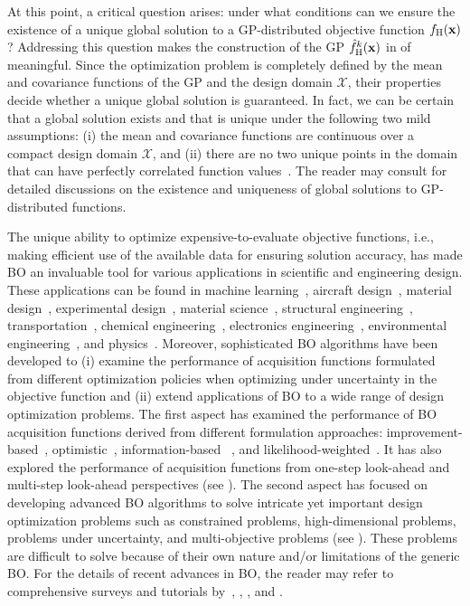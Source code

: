 \documentclass[iicol,sn-basic]{sn-jnl}%
\newcommand{\edit}[1]{\textcolor{red}{#1}} %
\begin{document}
{At this point, a critical question arises: under what conditions can we ensure the existence of a unique global solution to a GP-distributed objective function ${f}_\text{H}({\bf x})$?
Addressing this question makes the construction of the GP $\hat{f}_\text{H}^k({\bf x})$ in  of  meaningful.
Since the optimization problem is completely defined by the mean and covariance functions of the GP and the design domain $\mathcal{X}$, their properties decide whether a unique global solution is guaranteed.
In fact, we can be certain that a global solution exists and that is unique under the following two mild assumptions: (i) the mean and covariance functions are continuous over a compact design domain $\mathcal{X}$, and (ii) there are no two unique points in the domain that can have perfectly correlated function values~\citep{Garnett2023}.
The reader may consult \cite{Garnett2023} for detailed discussions on the existence and uniqueness of global solutions to GP-distributed functions.} 

The unique ability to optimize expensive-to-evaluate objective functions, i.e., making efficient use of the available data for ensuring solution accuracy, has made BO an invaluable tool for various applications in scientific and engineering design.
These applications can be found in machine learning~\citep{Bergstra2011}, aircraft design~\citep{Priem2020}, material design~\citep{Tran2019,Khatamsaz2021md}, experimental design~\citep{Greenhill2020}, material science~\citep{Ueno2016}, structural engineering~\citep{Mathern2021}, transportation~\citep{ShiR2021}, chemical engineering~\citep{Park2018}, electronics engineering~\citep{Torun2018}, environmental engineering~\citep{Manheim2019}, and  physics~\citep{Roussel2021}.
Moreover, sophisticated BO algorithms have been developed to
(i) examine the performance of acquisition functions formulated from different optimization policies
when optimizing under uncertainty in the objective function and
(ii) extend applications of BO to a wide range of design optimization problems.
The first aspect has examined the performance of BO acquisition functions derived from different formulation approaches: improvement-based~\citep{Jones2001}, optimistic~\citep{Srinivas2010}, information-based ~\citep{Hennig2012}, and likelihood-weighted~\citep{Blanchard2021jcp}.
It has also explored the performance of acquisition functions from one-step look-ahead and multi-step look-ahead perspectives (see ).
The second aspect has focused on developing advanced BO algorithms to solve intricate yet important design optimization problems such as constrained problems, high-dimensional problems, problems under uncertainty, and multi-objective problems (see ).
These problems are difficult to solve because of their own nature and/or limitations of the generic BO.
For the details of recent advances in BO, the reader may refer to comprehensive surveys and tutorials by~\cite{Brochu2010}, \cite{Shahriari2016}, \cite{Frazier2018}, and \cite{Wang2023}.
\end{document}
